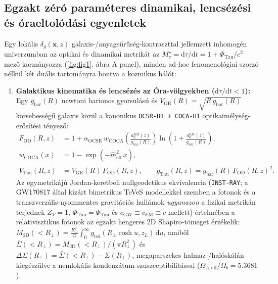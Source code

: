 \documentclass[11pt,a4paper]{article}
\begin{document}
\subsection{Egzakt zéró paraméteres dinamikai, lencsézési és óraeltolódási egyenletek}

Egy lokális $\delta_g(\mathbf{x}, z)$ galaxis-/anyagsűrűség-kontraszttal jellemzett inhomogén univerzumban az optikai és dinamikai metrikát az $M_\tau^\star = \mathrm{d}\tau/\mathrm{d}t = 1 + \Phi_{\mathrm{Tau}}/c^2$ mező kormányozza (\ref{fig:fig1}. ábra A panel), minden ad-hoc fenomenológiai szorzó nélkül két duális tartományra bontva a kozmikus hálót:
\begin{enumerate}
  \item \textbf{Galaktikus kinematika és lencsézés az Óra-völgyekben ($\mathrm{d}\tau/\mathrm{d}t < 1$):} Egy $g_{\mathrm{bar}}(R)$ newtoni barionos gyorsulású és $V_{\mathrm{GR}}(R) = \sqrt{R\,g_{\mathrm{bar}}(R)}$ körsebességű galaxis körül a kanonikus \texttt{OCSR-H1 + COCA-H1} optikaimélység-erősítési tényező:
  \begin{align}
    F_{\mathrm{OD}}(R, z) &= 1 + \alpha_{\mathrm{OCSR}}\,w_{\mathrm{COCA}}\!\left(\frac{a_0^{\mathrm{KH}}(z)}{g_{\mathrm{bar}}(R)}\right)\ln\!\left(1 + \frac{a_0^{\mathrm{KH}}(z)}{g_{\mathrm{bar}}(R)}\right), \label{eq:f_od} \\
    w_{\mathrm{COCA}}(x) &= 1 - \exp\!\left(-\hat{m}_{\mathrm{eff}}^2\,x\right), \label{eq:w_coca} \\
    V_{\mathrm{Tau}}(R, z) &= V_{\mathrm{GR}}(R)\,F_{\mathrm{OD}}(R, z), \qquad
    g_{\mathrm{Tau}}(R, z) = g_{\mathrm{bar}}(R)\,F_{\mathrm{OD}}(R, z)^2. \label{eq:v_tau}
  \end{align}
  Az egymetrikájú Jordan-keretbeli nullgeodetikus ekvivalencia (\texttt{INST-RAY}; a GW170817 által kizárt bimetrikus TeVeS modellekkel szemben a fotonok és a transzverzális-nyommentes gravitációs hullámok \emph{ugyanazon} a fizikai metrikán terjednek $Z_T = 1$, $\Phi_{\mathrm{Tau}} = \Psi_{\mathrm{Tau}}$ és $c_{\mathrm{GW}} \equiv c_{\mathrm{EM}} \equiv c$ mellett) értelmében a relativisztikus fotonok az egzakt hengeres 2D Shapiro-tömeget érzékelik: $M_{2\mathrm{D}}(<R_\perp) = \frac{R_\perp^2}{G}\int_0^\infty g_{\mathrm{tot}}(R_\perp\cosh u, z_L)\,\mathrm{d}u$, amiből $\bar{\Sigma}(<R_\perp) = M_{2\mathrm{D}}(<R_\perp)/(\pi R_\perp^2)$ és $\Delta\Sigma(R_\perp) = \bar{\Sigma}(<R_\perp) - \Sigma(R_\perp)$, megaparszekes halmaz-/halóskálán kiegészülve a nemlokális kondenzátum-szuszceptibilitással ($\Omega_{A,\mathrm{eff}}/\Omega_b = 5.3681$).

\end{enumerate}
\end{document}
